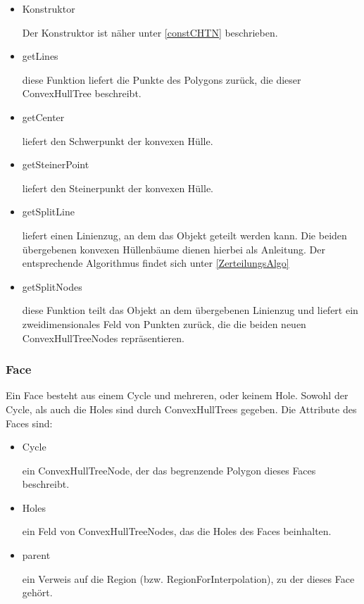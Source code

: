 \begin{itemize}
\item Konstruktor

Der Konstruktor ist näher unter \ref{constCHTN} beschrieben.

\item getLines

diese Funktion liefert die Punkte des Polygons zurück, die dieser ConvexHullTree beschreibt.

\item getCenter

liefert den Schwerpunkt der konvexen Hülle.

\item getSteinerPoint

liefert den Steinerpunkt der konvexen Hülle.

\item getSplitLine

liefert einen Linienzug, an dem das Objekt geteilt werden kann. Die beiden übergebenen konvexen Hüllenbäume dienen hierbei als Anleitung. Der entsprechende Algorithmus findet sich unter \ref{ZerteilungsAlgo}

\item getSplitNodes

diese Funktion teilt das Objekt an dem übergebenen Linienzug und liefert ein zweidimensionales Feld von Punkten zurück, die die beiden neuen ConvexHullTreeNodes repräsentieren.  

\end{itemize}


\subsubsection{Face}

Ein Face besteht aus einem Cycle und mehreren, oder keinem Hole. Sowohl der Cycle, als auch die Holes sind durch ConvexHullTrees gegeben. Die Attribute des Faces sind:

\begin{itemize}
\item Cycle

ein ConvexHullTreeNode, der das begrenzende Polygon dieses Faces beschreibt.

\item Holes

ein Feld von ConvexHullTreeNodes, das die Holes des Faces beinhalten.

\item parent

ein Verweis auf die Region (bzw. RegionForInterpolation), zu der dieses Face gehört.

\end{itemize}

